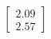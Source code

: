 \documentclass[preview]{standalone}
\begin{document}
\begin{align*}
\begin{bmatrix} 2.09 \\ 2.57 \end{bmatrix}
\end{align*}
\end{document}
